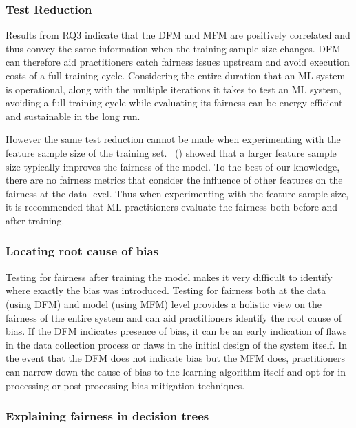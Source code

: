 \documentclass{article}
\newcommand{\citet}[1]{\citeauthor{#1}~(\citeyear{#1})}
\begin{document}
\subsubsection{Test Reduction}\label{sec:discuss-test-red}

Results from RQ3 indicate that the DFM and MFM are positively
correlated and thus convey the same information when the training
sample size changes. DFM can therefore aid practitioners catch
fairness issues upstream and avoid execution costs of a full training
cycle. Considering the entire duration that an ML system is
operational, along with the multiple iterations it takes to test an ML
system, avoiding a full training cycle while evaluating its fairness
can be energy efficient and sustainable in the long run.

However the same test reduction cannot be made when experimenting with
the feature sample size of the training
set. \citet{zhang2021ignorance} showed that a larger feature sample
size typically improves the fairness of the model. To the best of our
knowledge, there are no fairness metrics that consider the influence
of other features on the fairness at the data level. Thus when
experimenting with the feature sample size, it is recommended that ML
practitioners evaluate the fairness both before and after training.

\subsubsection{Locating root cause of bias}\label{sec:discuss-root-cause-bias}

Testing for fairness after training the model makes it very difficult
to identify where exactly the bias was introduced. Testing for
fairness both at the data (using DFM) and model (using MFM) level
provides a holistic view on the fairness of the entire system and can
aid practitioners identify the root cause of bias. If the DFM
indicates presence of bias, it can be an early indication of flaws in
the data collection process or flaws in the initial design of the
system itself. In the event that the DFM does not indicate bias but
the MFM does, practitioners can narrow down the cause of bias to the
learning algorithm itself and opt for in-processing or post-processing
bias mitigation techniques.

\subsubsection{Explaining fairness in decision trees}\label{sec:discuss-explain-fair-dt}
\end{document}
